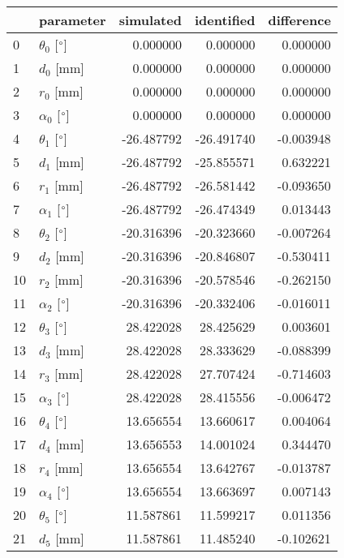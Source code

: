 \documentclass{standalone}%
\begin{document}
%
\normalsize%
\begin{tabular}{llrrr}
\toprule
{} &                 parameter &  simulated & identified & difference \\
\midrule
0  &  $\theta_{0}$ [$\degree$] &   0.000000 &   0.000000 &   0.000000 \\
1  &              $d_{0}$ [mm] &   0.000000 &   0.000000 &   0.000000 \\
2  &              $r_{0}$ [mm] &   0.000000 &   0.000000 &   0.000000 \\
3  &  $\alpha_{0}$ [$\degree$] &   0.000000 &   0.000000 &   0.000000 \\
4  &  $\theta_{1}$ [$\degree$] & -26.487792 & -26.491740 &  -0.003948 \\
5  &              $d_{1}$ [mm] & -26.487792 & -25.855571 &   0.632221 \\
6  &              $r_{1}$ [mm] & -26.487792 & -26.581442 &  -0.093650 \\
7  &  $\alpha_{1}$ [$\degree$] & -26.487792 & -26.474349 &   0.013443 \\
8  &  $\theta_{2}$ [$\degree$] & -20.316396 & -20.323660 &  -0.007264 \\
9  &              $d_{2}$ [mm] & -20.316396 & -20.846807 &  -0.530411 \\
10 &              $r_{2}$ [mm] & -20.316396 & -20.578546 &  -0.262150 \\
11 &  $\alpha_{2}$ [$\degree$] & -20.316396 & -20.332406 &  -0.016011 \\
12 &  $\theta_{3}$ [$\degree$] &  28.422028 &  28.425629 &   0.003601 \\
13 &              $d_{3}$ [mm] &  28.422028 &  28.333629 &  -0.088399 \\
14 &              $r_{3}$ [mm] &  28.422028 &  27.707424 &  -0.714603 \\
15 &  $\alpha_{3}$ [$\degree$] &  28.422028 &  28.415556 &  -0.006472 \\
16 &  $\theta_{4}$ [$\degree$] &  13.656554 &  13.660617 &   0.004064 \\
17 &              $d_{4}$ [mm] &  13.656553 &  14.001024 &   0.344470 \\
18 &              $r_{4}$ [mm] &  13.656554 &  13.642767 &  -0.013787 \\
19 &  $\alpha_{4}$ [$\degree$] &  13.656554 &  13.663697 &   0.007143 \\
20 &  $\theta_{5}$ [$\degree$] &  11.587861 &  11.599217 &   0.011356 \\
21 &              $d_{5}$ [mm] &  11.587861 &  11.485240 &  -0.102621 \\

\end{tabular}
\end{document}
